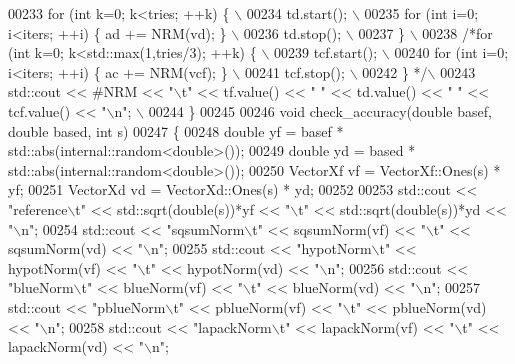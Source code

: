 \begin{DoxyCode}
00233 \textcolor{preprocessor}{  for (int k=0; k<tries; ++k) \{ \(\backslash\)}
00234 \textcolor{preprocessor}{    td.start(); \(\backslash\)}
00235 \textcolor{preprocessor}{    for (int i=0; i<iters; ++i) \{ ad += NRM(vd); \} \(\backslash\)}
00236 \textcolor{preprocessor}{    td.stop(); \(\backslash\)}
00237 \textcolor{preprocessor}{  \} \(\backslash\)}
00238 \textcolor{preprocessor}{  }\textcolor{comment}{/*for (int k=0; k<std::max(1,tries/3); ++k) \{ \(\backslash\)}
00239 \textcolor{comment}{    tcf.start(); \(\backslash\)}
00240 \textcolor{comment}{    for (int i=0; i<iters; ++i) \{ ac += NRM(vcf); \} \(\backslash\)}
00241 \textcolor{comment}{    tcf.stop(); \(\backslash\)}
00242 \textcolor{comment}{  \} */}\textcolor{preprocessor}{\(\backslash\)}
00243 \textcolor{preprocessor}{  std::cout << #NRM << "\(\backslash\)t" << tf.value() << "   " << td.value() <<  "    " << tcf.value() << "\(\backslash\)n"; \(\backslash\)}
00244 \textcolor{preprocessor}{\}}
00245 
00246 \textcolor{keywordtype}{void} check\_accuracy(\textcolor{keywordtype}{double} basef, \textcolor{keywordtype}{double} based, \textcolor{keywordtype}{int} s)
00247 \{
00248   \textcolor{keywordtype}{double} yf = basef * std::abs(internal::random<double>());
00249   \textcolor{keywordtype}{double} yd = based * std::abs(internal::random<double>());
00250   VectorXf vf = VectorXf::Ones(s) * yf;
00251   VectorXd vd = VectorXd::Ones(s) * yd;
00252 
00253   std::cout << \textcolor{stringliteral}{"reference\(\backslash\)t"} << std::sqrt(\textcolor{keywordtype}{double}(s))*yf << \textcolor{stringliteral}{"\(\backslash\)t"} << std::sqrt(\textcolor{keywordtype}{double}(s))*yd << \textcolor{stringliteral}{"\(\backslash\)n"};
00254   std::cout << \textcolor{stringliteral}{"sqsumNorm\(\backslash\)t"} << sqsumNorm(vf) << \textcolor{stringliteral}{"\(\backslash\)t"} << sqsumNorm(vd) << \textcolor{stringliteral}{"\(\backslash\)n"};
00255   std::cout << \textcolor{stringliteral}{"hypotNorm\(\backslash\)t"} << hypotNorm(vf) << \textcolor{stringliteral}{"\(\backslash\)t"} << hypotNorm(vd) << \textcolor{stringliteral}{"\(\backslash\)n"};
00256   std::cout << \textcolor{stringliteral}{"blueNorm\(\backslash\)t"} << blueNorm(vf) << \textcolor{stringliteral}{"\(\backslash\)t"} << blueNorm(vd) << \textcolor{stringliteral}{"\(\backslash\)n"};
00257   std::cout << \textcolor{stringliteral}{"pblueNorm\(\backslash\)t"} << pblueNorm(vf) << \textcolor{stringliteral}{"\(\backslash\)t"} << pblueNorm(vd) << \textcolor{stringliteral}{"\(\backslash\)n"};
00258   std::cout << \textcolor{stringliteral}{"lapackNorm\(\backslash\)t"} << lapackNorm(vf) << \textcolor{stringliteral}{"\(\backslash\)t"} << lapackNorm(vd) << \textcolor{stringliteral}{"\(\backslash\)n"};

\end{DoxyCode}
